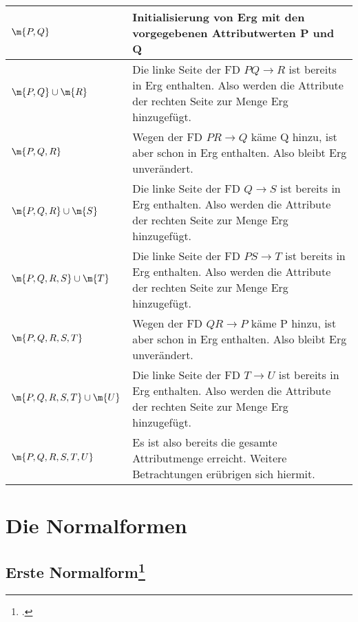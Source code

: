 \documentclass{lehramt-informatik-haupt}
\begin{document}
\noindent
\begin{tabularx}{\linewidth}{lX}
$\m{P, Q}$ &
Initialisierung von Erg mit den vorgegebenen Attributwerten P und Q
\\\hline

$\m{P, Q} \cup \m{R}$  &
Die linke Seite der FD $P Q \rightarrow R$ ist bereits in Erg enthalten.
Also werden die Attribute der rechten Seite zur Menge Erg hinzugefügt.
\\\hline

$\m{P, Q, R}$ &
Wegen der FD $PR \rightarrow Q$ käme Q hinzu, ist aber schon in Erg
enthalten. Also bleibt Erg unverändert.
\\\hline

$\m{P, Q, R} \cup \m{S}$ &
Die linke Seite der FD $Q \rightarrow S$ ist bereits in Erg enthalten.
Also werden die Attribute der rechten Seite zur Menge Erg hinzugefügt.
\\\hline

$\m{P, Q, R, S} \cup \m{T}$ &
Die linke Seite der FD $PS \rightarrow T$ ist bereits in Erg enthalten.
Also werden die Attribute der rechten Seite zur Menge Erg hinzugefügt.
\\\hline

$\m{P, Q, R, S, T}$ &
Wegen der FD $QR \rightarrow P$ käme P hinzu, ist aber schon in Erg
enthalten. Also bleibt Erg unverändert.
\\\hline

$\m{P, Q, R, S, T} \cup \m{U}$ &
Die linke Seite der FD $T \rightarrow U$ ist bereits in Erg enthalten.
Also werden die Attribute der rechten Seite zur Menge Erg hinzugefügt.
\\\hline

$\m{P, Q, R, S, T, U}$ &
Es ist also bereits die gesamte Attributmenge erreicht. Weitere
Betrachtungen erübrigen sich hiermit.
\\\hline
\end{tabularx}

\section{Die Normalformen}

%

\subsection{Erste Normalform\footcite[Seite 195]{winter}}
\end{document}

